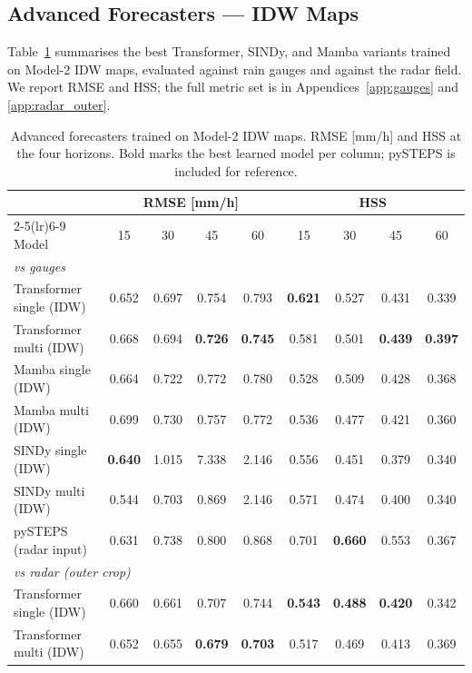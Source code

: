 \documentclass[12pt, a4paper]{article}
\begin{document}
\subsection{Advanced Forecasters --- IDW Maps}\label{sec:results:idw}

Table~\ref{tab:adv_idw} summarises the best Transformer, SINDy, and
Mamba variants trained on Model-2 IDW maps, evaluated against rain
gauges and against the radar field. We report RMSE and HSS; the full
metric set is in Appendices~\ref{app:gauges} and \ref{app:radar_outer}.

\begin{table}[h]
\centering
\caption{Advanced forecasters trained on Model-2 IDW maps. RMSE
[mm/h] and HSS at the four horizons. Bold marks the best learned
model per column; pySTEPS is included for reference.}
\label{tab:adv_idw}
\setlength{\tabcolsep}{4pt}
\begin{tabular}{lcccccccc}
\toprule
& \multicolumn{4}{c}{\textbf{RMSE} [mm/h]} & \multicolumn{4}{c}{\textbf{HSS}} \\
\cmidrule(lr){2-5}\cmidrule(lr){6-9}
Model & 15 & 30 & 45 & 60 & 15 & 30 & 45 & 60 \\
\midrule
\multicolumn{9}{l}{\textit{vs gauges}} \\
Transformer single (IDW)  & 0.652 & 0.697 & 0.754 & 0.793 & \textbf{0.621} & 0.527 & 0.431 & 0.339 \\
Transformer multi (IDW)   & 0.668 & 0.694 & \textbf{0.726} & \textbf{0.745} & 0.581 & 0.501 & \textbf{0.439} & \textbf{0.397} \\
Mamba single (IDW)        & 0.664 & 0.722 & 0.772 & 0.780 & 0.528 & 0.509 & 0.428 & 0.368 \\
Mamba multi (IDW)         & 0.699 & 0.730 & 0.757 & 0.772 & 0.536 & 0.477 & 0.421 & 0.360 \\
SINDy single (IDW)        & \textbf{0.640} & 1.015 & 7.338 & 2.146 & 0.556 & 0.451 & 0.379 & 0.340 \\
SINDy multi (IDW)         & 0.544 & 0.703 & 0.869 & 2.146 & 0.571 & 0.474 & 0.400 & 0.340 \\
pySTEPS (radar input)     & 0.631 & 0.738 & 0.800 & 0.868 & 0.701 & \textbf{0.660} & 0.553 & 0.367 \\
\midrule
\multicolumn{9}{l}{\textit{vs radar (outer crop)}} \\
Transformer single (IDW)  & 0.660 & 0.661 & 0.707 & 0.744 & \textbf{0.543} & \textbf{0.488} & \textbf{0.420} & 0.342 \\
Transformer multi (IDW)   & 0.652 & 0.655 & \textbf{0.679} & \textbf{0.703} & 0.517 & 0.469 & 0.413 & 0.369 \\

\end{tabular}
\end{table}
\end{document}
